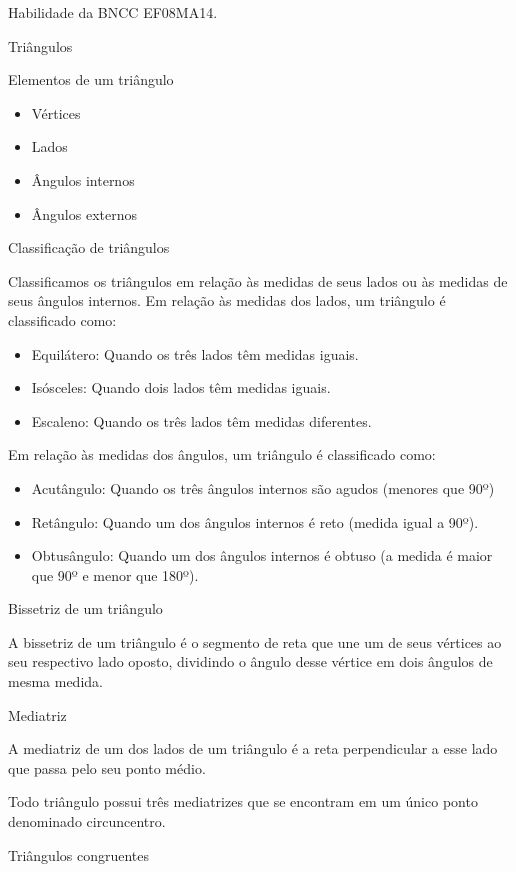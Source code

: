 {Habilidade da BNCC EF08MA14.

Triângulos

Elementos de um triângulo

\begin{itemize}
\item
  Vértices
\item
  Lados
\item
  Ângulos internos
\item
  Ângulos externos
\end{itemize}

Classificação de triângulos

Classificamos os triângulos em relação às medidas de seus lados ou às
medidas de seus ângulos internos. Em relação às medidas dos lados, um
triângulo é classificado como:

\begin{itemize}
\item
  Equilátero: Quando os três lados têm medidas iguais.
\item
  Isósceles: Quando dois lados têm medidas iguais.
\item
  Escaleno: Quando os três lados têm medidas diferentes.
\end{itemize}

Em relação às medidas dos ângulos, um triângulo é classificado como:

\begin{itemize}
\item
  Acutângulo: Quando os três ângulos internos são agudos (menores que
  90º)
\item
  Retângulo: Quando um dos ângulos internos é reto (medida igual a 90º).
\item
  Obtusângulo: Quando um dos ângulos internos é obtuso (a medida é maior
  que 90º e menor que 180º).
\end{itemize}

Bissetriz de um triângulo

A bissetriz de um triângulo é o segmento de reta que une um de seus
vértices ao seu respectivo lado oposto, dividindo o ângulo desse vértice
em dois ângulos de mesma medida.

Mediatriz

A mediatriz de um dos lados de um triângulo é a reta perpendicular a
esse lado que passa pelo seu ponto médio.

Todo triângulo possui três mediatrizes que se encontram em um único
ponto denominado circuncentro.

Triângulos congruentes

}
